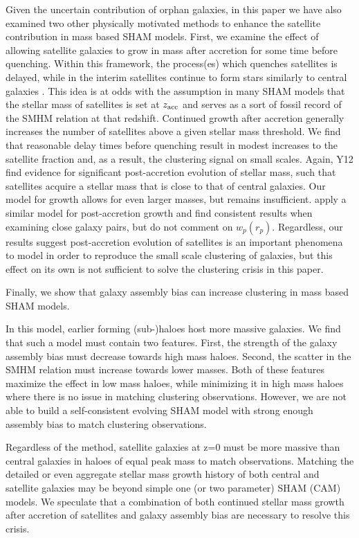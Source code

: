 \documentclass[a4paper,fleqn,usenatbib]{mnras}
\begin{document}
Given the uncertain contribution of orphan galaxies, in this paper we have also examined two other physically motivated methods to enhance the satellite contribution in mass based SHAM models.  First, we examine the effect of allowing satellite galaxies to grow in mass after accretion for some time before quenching.  Within this framework, the process(es) which quenches satellites is delayed, while in the interim satellites continue to form stars similarly to central galaxies \citep{Wetzel:2013dw}.  This idea is at odds with the assumption in many SHAM models that the stellar mass of satellites is set at $z_{\rm acc}$ and serves as a sort of fossil record of the SMHM relation at that redshift.  Continued growth after accretion generally increases the number of satellites above a given stellar mass threshold.  We find that reasonable delay times before quenching result in modest increases to the satellite fraction and, as a result, the clustering signal on small scales.  Again, Y12 find evidence for significant post-accretion evolution of stellar mass, such that satellites acquire a stellar mass that is close to that of central galaxies.  Our model for growth allows for even larger masses, but remains insufficient.  \citep{Behroozi:2015wx} apply a similar model for post-accretion growth and find consistent results when examining close galaxy pairs, but do not comment on $w_p(r_p)$.  Regardless, our results suggest post-accretion evolution of satellites is an important phenomena to model in order to reproduce the small scale clustering of galaxies, but this effect on its own is not sufficient to solve the clustering crisis in this paper.           

Finally, we show that galaxy assembly bias can increase clustering in mass based SHAM models.

    In this model, earlier forming (sub-)haloes host more massive galaxies.  We find that such a model must contain two features.  First, the strength of the galaxy assembly bias must decrease towards high mass haloes.  Second, the scatter in the SMHM relation must increase towards lower masses.  Both of these features maximize the effect in low mass haloes, while minimizing it in high mass haloes where there is no issue in matching clustering observations.  However, we are not able to build a self-consistent evolving SHAM model with strong enough assembly bias to match clustering observations.

Regardless of the method, satellite galaxies at z=0 must be more massive than central galaxies in haloes of equal peak mass to match observations.  Matching the detailed or even aggregate stellar mass growth history of both central and satellite galaxies may be beyond simple one (or two parameter) SHAM (CAM) models.  We speculate that a combination of both continued stellar mass growth after accretion of satellites and galaxy assembly bias are necessary to resolve this crisis.
\end{document}
